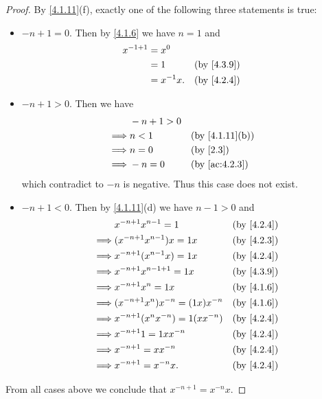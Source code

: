 \begin{proof}
  By \cref{4.1.11}(f), exactly one of the following three statements is true:
  \begin{itemize}
    \item \(-n + 1 = 0\).
          Then by \cref{4.1.6} we have \(n = 1\) and
          \begin{align*}
            x^{-1 + 1} & = x^0                       \\
                       & = 1         &  & \by{4.3.9} \\
                       & = x^{-1} x. &  & \by{4.2.4}
          \end{align*}
    \item \(-n + 1 > 0\).
          Then we have
          \begin{align*}
                     & -n + 1 > 0                                   \\
            \implies & n < 1      &  & \text{(by \cref{4.1.11}(b))} \\
            \implies & n = 0      &  & \by{2.3}                     \\
            \implies & -n = 0     &  & \by{ac:4.2.3}
          \end{align*}
          which contradict to \(-n\) is negative.
          Thus this case does not exist.
    \item \(-n + 1 < 0\).
          Then by \cref{4.1.11}(d) we have \(n - 1 > 0\) and
          \begin{align*}
                     & x^{-n + 1} x^{n - 1} = 1              &  & \by{4.2.4} \\
            \implies & (x^{-n + 1} x^{n - 1}) x = 1x         &  & \by{4.2.3} \\
            \implies & x^{-n + 1} (x^{n - 1} x) = 1x         &  & \by{4.2.4} \\
            \implies & x^{-n + 1} x^{n - 1 + 1} = 1x         &  & \by{4.3.9} \\
            \implies & x^{-n + 1} x^n = 1x                   &  & \by{4.1.6} \\
            \implies & (x^{-n + 1} x^n) x^{-n} = (1x) x^{-n} &  & \by{4.1.6} \\
            \implies & x^{-n + 1} (x^n x^{-n}) = 1(x x^{-n}) &  & \by{4.2.4} \\
            \implies & x^{-n + 1} 1 = 1x x^{-n}              &  & \by{4.2.4} \\
            \implies & x^{-n + 1} = x x^{-n}                 &  & \by{4.2.4} \\
            \implies & x^{-n + 1} = x^{-n} x.                &  & \by{4.2.4}
          \end{align*}
  \end{itemize}
  From all cases above we conclude that \(x^{-n + 1} = x^{-n} x\).
\end{proof}

